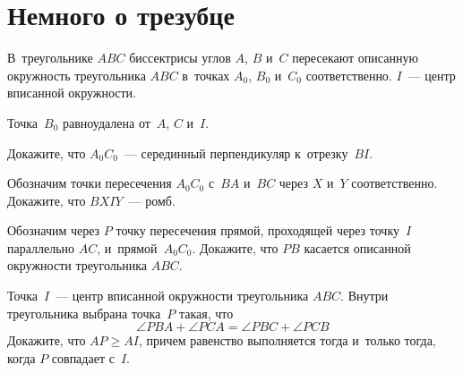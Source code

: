 
\section*{Немного о трезубце}


В~треугольнике $ABC$ биссектрисы углов $A$, $B$ и~$C$ пересекают описанную
окружность треугольника $ABC$ в~точках $A_0$, $B_0$ и~$C_0$ соответственно.
$I$~--- центр вписанной окружности.

\begin{problems}

\item{}
Точка~$B_0$ равноудалена от~$A$, $C$ и~$I$.

\item
Докажите, что $A_0 C_0$~--- серединный перпендикуляр к~отрезку~$BI$.

\item
Обозначим точки пересечения $A_0 C_0$ с~$BA$ и~$BC$ через $X$ и~$Y$
соответственно.
Докажите, что $BXIY$~--- ромб.

\item
Обозначим через $P$ точку пересечения прямой, проходящей через точку~$I$
параллельно $AC$, и~прямой~$A_0 C_0$.
Докажите, что $PB$ касается описанной окружности треугольника $ABC$.

\item
Точка~$I$~--- центр вписанной окружности треугольника $ABC$.
Внутри треугольника выбрана точка~$P$ такая,
что
\[
    \angle PBA + \angle PCA
=
    \angle PBC + \angle PCB
\]
Докажите, что $AP \geq AI$, причем равенство выполняется тогда и~только тогда,
когда $P$ совпадает с~$I$.

\end{problems}

